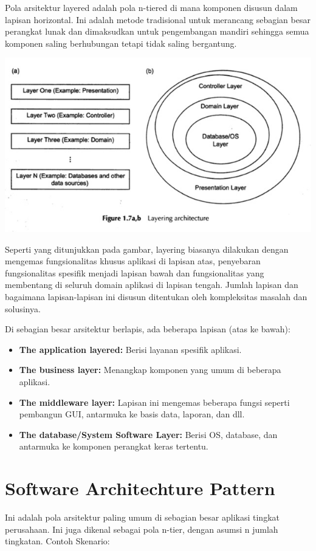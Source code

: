 \documentclass[a4paper,12pt]{article}
\begin{document}
Pola arsitektur layered adalah pola n-tiered di mana komponen disusun dalam lapisan horizontal. Ini adalah metode tradisional untuk merancang sebagian besar perangkat lunak dan dimaksudkan untuk pengembangan mandiri sehingga semua komponen saling berhubungan tetapi tidak saling bergantung.

\includegraphics{Layering Architecture.jpg}

Seperti yang ditunjukkan pada gambar, layering biasanya dilakukan dengan mengemas fungsionalitas khusus aplikasi di lapisan atas, penyebaran fungsionalitas spesifik menjadi lapisan bawah dan fungsionalitas yang membentang di seluruh domain aplikasi di lapisan tengah. Jumlah lapisan dan bagaimana lapisan-lapisan ini disusun ditentukan oleh kompleksitas masalah dan solusinya.

Di sebagian besar arsitektur berlapis, ada beberapa lapisan (atas ke bawah):

\begin{itemize}
	\item \textbf{The application layered:} Berisi layanan spesifik aplikasi.
	\item \textbf{The business layer:} Menangkap komponen yang umum di beberapa aplikasi.
	\item \textbf{The middleware layer:} Lapisan ini mengemas beberapa fungsi seperti pembangun GUI, antarmuka ke basis data, laporan, dan dll.
	\item \textbf{The database/System Software Layer:} Berisi OS, database, dan antarmuka ke komponen perangkat keras tertentu.
\end{itemize}


\section*{Software Architechture Pattern}
Ini adalah pola arsitektur paling umum di sebagian besar aplikasi tingkat perusahaan. Ini juga dikenal sebagai pola n-tier, dengan asumsi n jumlah tingkatan. Contoh Skenario:
\end{document}
